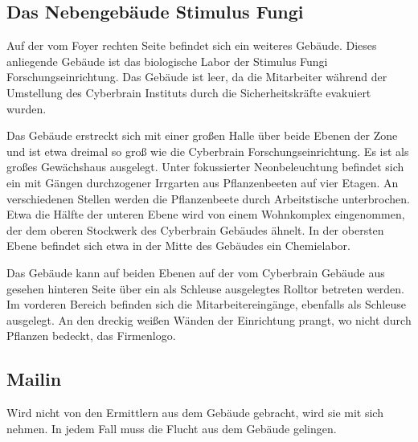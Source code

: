 \subsection{Das Nebengebäude Stimulus Fungi} 
Auf der vom Foyer rechten Seite befindet sich ein weiteres Gebäude. Dieses anliegende Gebäude ist das biologische Labor der Stimulus Fungi Forschungseinrichtung. Das Gebäude ist leer, da die Mitarbeiter während der Umstellung des Cyberbrain Instituts durch die Sicherheitskräfte evakuiert wurden.

Das Gebäude erstreckt sich mit einer großen Halle über beide Ebenen der Zone und ist etwa dreimal so groß wie die Cyberbrain Forschungseinrichtung. Es ist als großes Gewächshaus ausgelegt. Unter fokussierter Neonbeleuchtung befindet sich ein mit Gängen durchzogener Irrgarten aus Pflanzenbeeten auf vier Etagen. An verschiedenen Stellen werden die Pflanzenbeete durch Arbeitstische unterbrochen. Etwa die Hälfte der unteren Ebene wird von einem Wohnkomplex eingenommen, der dem oberen Stockwerk des Cyberbrain Gebäudes ähnelt. In der obersten Ebene befindet sich etwa in der Mitte des Gebäudes ein Chemielabor.

Das Gebäude kann auf beiden Ebenen auf der vom Cyberbrain Gebäude aus gesehen hinteren Seite über ein als Schleuse ausgelegtes Rolltor betreten werden. Im vorderen Bereich befinden sich die Mitarbeitereingänge, ebenfalls als Schleuse ausgelegt. An den dreckig weißen Wänden der Einrichtung prangt, wo nicht durch Pflanzen bedeckt, das Firmenlogo.

\subsection[\ml{}]{Mailin}
Wird \ml{} nicht von den Ermittlern aus dem Gebäude gebracht, wird \xl{} sie mit sich nehmen. In jedem Fall muss \ml{} die Flucht aus dem Gebäude gelingen.

%
%

